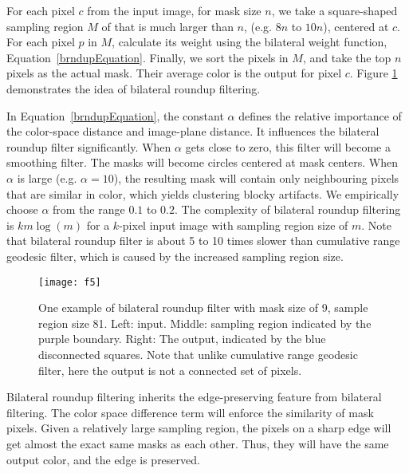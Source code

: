 For each pixel $c$ from the input image, for mask size $n$, we take a square-shaped sampling region $M$ of that is much larger than $n$, (e.g. $8n$ to $10n$), centered at $c$. For each pixel $p$ in $M$, calculate its weight using the bilateral weight function, Equation~\eqref{brndupEquation}. Finally, we sort the pixels in $M$, and take the top $n$ pixels as the actual mask. Their average color is the output for pixel $c$. Figure \ref{fig:BrndupExplanation} demonstrates the idea of bilateral roundup filtering.

In Equation~\eqref{brndupEquation}, the constant $\alpha$ defines the relative importance of the color-space distance and image-plane distance. It influences the bilateral roundup filter significantly. When $\alpha$ gets close to zero, this filter will become a smoothing filter. The masks will become circles centered at mask centers. When $\alpha$ is large (e.g. $\alpha = 10$), the resulting mask will contain only neighbouring pixels that are similar in color, which yields clustering blocky artifacts. We empirically choose $\alpha$ from the range $0.1$ to $0.2$. The complexity of bilateral roundup filtering is $km\log(m)$ for a $k$-pixel input image with sampling region size of $m$. Note that bilateral roundup filter is about 5 to 10 times slower than cumulative range geodesic filter, which is caused by the increased sampling region size. 


\begin{figure}[htbp]\centering
\texttt{[image: f5]}
\caption{One example of bilateral roundup filter with mask size of 9, sample region size 81. Left: input. Middle: sampling region indicated by the purple boundary. Right: The output, indicated by the blue disconnected squares. Note that unlike cumulative range geodesic filter, here the output is not a connected set of pixels.}
\label{fig:BrndupExplanation}
\end{figure}

Bilateral roundup filtering inherits the edge-preserving feature from bilateral filtering. The color space difference term will enforce the similarity of mask pixels. Given a relatively large sampling region, the pixels on a sharp edge will get almost the exact same masks as each other. Thus, they will have the same output color, and the edge is preserved. 

